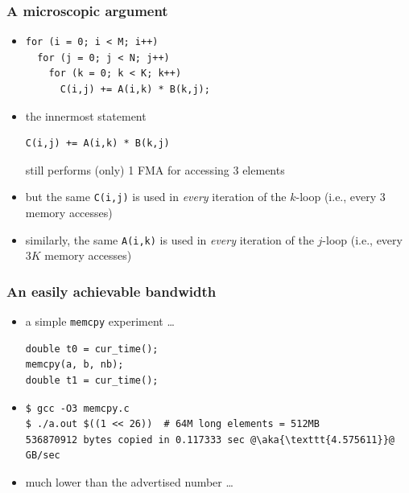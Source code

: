 \documentclass[12pt,dvipdfmx]{beamer}
\newcommand{\ao}[1]{{\color{blue}#1}}
\newcommand{\aka}[1]{{\color{red}#1}}
\begin{document}
\begin{frame}[fragile]
  \frametitle{A microscopic argument}
  \begin{itemize}
  \item []
\begin{lstlisting}
for (i = 0; i < M; i++)  
  for (j = 0; j < N; j++)  
    for (k = 0; k < K; k++)  
      C(i,j) += A(i,k) * B(k,j);
\end{lstlisting}
  \end{itemize}

\begin{itemize}
\item the innermost statement
\begin{lstlisting}
C(i,j) += A(i,k) * B(k,j)
\end{lstlisting}
still performs (only) \ao{1} FMA for accessing \ao{3} elements
\item but the same {\tt C(i,j)} is used in
  \ao{\it every} iteration of the $k$-loop
  (i.e., every 3 memory accesses)
\item similarly, the same {\tt A(i,k)} is used in \ao{\it every}
  iteration of the $j$-loop
  (i.e., every $3K$ memory accesses)
  
\end{itemize}

\end{frame}

\begin{frame}[fragile]
\frametitle{An easily achievable bandwidth}
\begin{itemize}
\item<1-> a simple \texttt{memcpy} experiment \ldots
\begin{lstlisting}
double t0 = cur_time();
memcpy(a, b, nb);
double t1 = cur_time();
\end{lstlisting}
\item<2-> []
\begin{lstlisting}
$ gcc -O3 memcpy.c
$ ./a.out $((1 << 26))  # 64M long elements = 512MB
536870912 bytes copied in 0.117333 sec @\aka{\texttt{4.575611}}@ GB/sec
\end{lstlisting} %
\item<3-> much lower than the advertised number \ldots
\end{itemize}
\end{frame}
\end{document}
